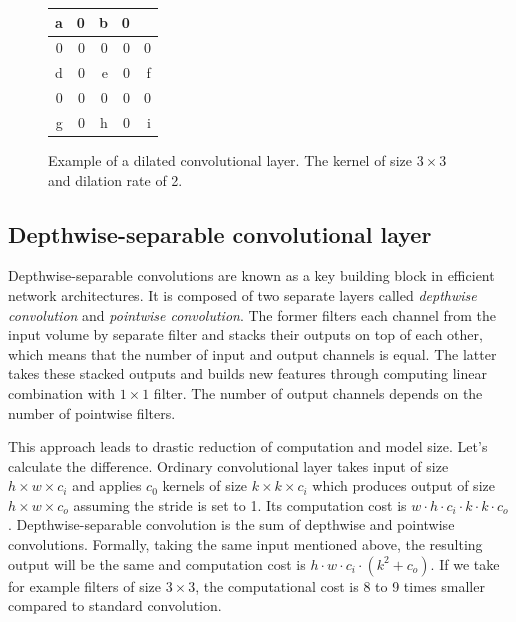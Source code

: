 \begin{figure}[h]
    \centering
    \begin{tabular}{|r|r|r|r|r|}
    \hline
    \cellcolor[HTML]{C0C0C0}a & 0 & \cellcolor[HTML]{C0C0C0}b & 0 & \cellcolor[HTML]{C0C0C0}{\color[HTML]{000000} c} \\ \hline
    0 & 0 & 0 & 0 & 0 \\ \hline
    \cellcolor[HTML]{C0C0C0}d & 0 & \cellcolor[HTML]{C0C0C0}e & 0 & \cellcolor[HTML]{C0C0C0}f \\ \hline
    0 & 0 & 0 & 0 & 0 \\ \hline
    \cellcolor[HTML]{C0C0C0}g & 0 & \cellcolor[HTML]{C0C0C0}h & 0 & \cellcolor[HTML]{C0C0C0}i \\ \hline
    \end{tabular}
    \caption[Example of a dilated convolutional layer]{Example of a dilated convolutional layer. The kernel of size $3\times 3$ and dilation rate of 2.}
    \label{img:dilated_conv}
\end{figure}

\subsection{Depthwise-separable convolutional layer}
\label{sec:cnn:depthwise_layer}

Depthwise-separable convolutions are known as a key building block in efficient
network architectures. It is composed of two separate layers called
\textit{depthwise convolution} and \textit{pointwise convolution}. 
The former filters each channel from the input volume by separate filter and stacks 
their outputs on top of each other, which means that the number of input and output
channels is equal. The latter takes these stacked outputs and builds new features
through computing linear combination with $1\times 1$ filter.
The number of output channels depends on the number of pointwise filters.

This approach leads to drastic reduction of computation and model size. Let's
calculate the difference. Ordinary convolutional layer takes input of size
$h\times w\times c_i$ and applies $c_0$ kernels of size $k\times k\times c_i$
which produces output of size $h\times w\times c_o$ assuming the stride is set to 1.
Its computation cost is $w\cdot h\cdot c_i\cdot k\cdot k\cdot c_o$.
Depthwise-separable convolution is the sum of depthwise and pointwise convolutions.
Formally, taking the same input mentioned above, the resulting output will be
the same and computation cost is $h\cdot w\cdot c_i\cdot (k^2 + c_o)$. If we take for
example filters of size $3\times 3$, the computational cost is 8 to 9 times smaller compared
to standard convolution. \cite{bib:howard2017mobilenets, bib:sandler2018mobilenetv2}

